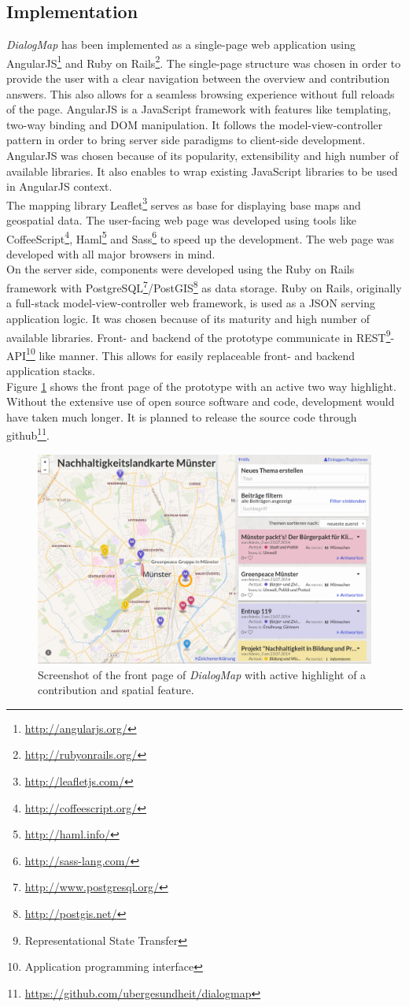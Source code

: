 \subsection{Implementation}
\label{sub:implementation}
\textit{DialogMap} has been implemented as a single-page web application using AngularJS\footnote{\url{http://angularjs.org/}} and Ruby on Rails\footnote{\url{http://rubyonrails.org/}}. The single-page structure was chosen in order to provide the user with a clear navigation between the overview and contribution answers. This also allows for a seamless browsing experience without full reloads of the page. AngularJS is a JavaScript framework with features like templating, two-way binding and DOM manipulation. It follows the model-view-controller pattern in order to bring server side paradigms to client-side development. AngularJS was chosen because of its popularity, extensibility and high number of available libraries. It also enables to wrap existing JavaScript libraries to be used in AngularJS context.\\
The mapping library Leaflet\footnote{\url{http://leafletjs.com/}} serves as base for displaying base maps and geospatial data. The user-facing web page was developed using tools like CoffeeScript\footnote{\url{http://coffeescript.org/}}, Haml\footnote{\url{http://haml.info/}} and Sass\footnote{\url{http://sass-lang.com/}} to speed up the development. The web page was developed with all major browsers in mind.\\
On the server side, components were developed using the Ruby on Rails framework with PostgreSQL\footnote{\url{http://www.postgresql.org/}}/PostGIS\footnote{\url{http://postgis.net/}} as data storage. Ruby on Rails, originally a full-stack model-view-controller web framework, is used as a JSON serving application logic. It was chosen because of its maturity and high number of available libraries. Front- and backend of the prototype communicate in REST\footnote{Representational State Transfer}-API\footnote{Application programming interface} like manner. This allows for easily replaceable front- and backend application stacks.\\
Figure \ref{fig:screenshot} shows the front page of the prototype with an active two way highlight.\\
Without the extensive use of open source software and code, development would have taken much longer. It is planned to release the source code through github\footnote{\url{https://github.com/ubergesundheit/dialogmap}}.

\begin{figure}[!h]
    \centering
    \includegraphics[width=0.9\columnwidth]{images/screenshot}
    \caption{Screenshot of the front page of \textit{DialogMap} with active highlight of a contribution and spatial feature.}
    \label{fig:screenshot}
\end{figure}